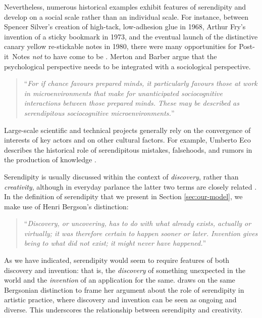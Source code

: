 Nevertheless, numerous historical examples exhibit features of
serendipity and develop on a social scale rather than an individual
scale.  For instance, between Spencer Silver's creation of high-tack,
low-adhesion glue in 1968, Arthur Fry's invention of a sticky bookmark in 1973,
and the eventual launch of the distinctive canary yellow re-stickable
notes in 1980, there were many opportunities for
Post-it\texttrademark\ Notes \emph{not} to have come to be
\cite{tce-postits}.  Merton and Barber argue that the
psychological perspective needs to be integrated with a
sociological perspective.
\begin{quote}
``\emph{For if chance favours prepared minds, it particularly favours
    those at work in microenvironments that make for unanticipated
    sociocognitive interactions between those prepared minds. These
    may be described as serendipitous sociocognitive
    microenvironments.}'' \cite[p. 259--260]{merton}
\end{quote}
Large-scale scientific and technical projects generally rely on the
convergence of interests of key actors and on other cultural factors.
For example, Umberto Eco describes the historical role of
serendipitous mistakes, falsehoods, and rumors in the production of
knowledge \citeyear{eco2013serendipities}.

Serendipity is usually discussed within
the context of \emph{discovery}, rather than \emph{creativity},
although in everyday parlance the latter two terms are closely related
\cite{jordanous12jims}.  In the definition of serendipity that we present in Section \ref{sec:our-model}, we make use
of Henri Bergson's distinction:
\begin{quote}
``\emph{Discovery, or uncovering, has to do with what already exists,
    actually or virtually; it was therefore certain to happen sooner
    or later.  Invention gives being to what did not exist; it might
    never have happened.}''~\cite[p. 58]{bergson2010creative}
\end{quote}
As we have indicated, serendipity would seem to require features of
both discovery and invention: that is, the \emph{discovery} of
something unexpected in the world and the \emph{invention} of an
application for the same.   draws on the same
Bergsonian distinction to frame her argument about the role of
serendipity in artistic practice, where discovery and invention can be
seen as ongoing and diverse.  This underscores the relationship
between serendipity and creativity.

